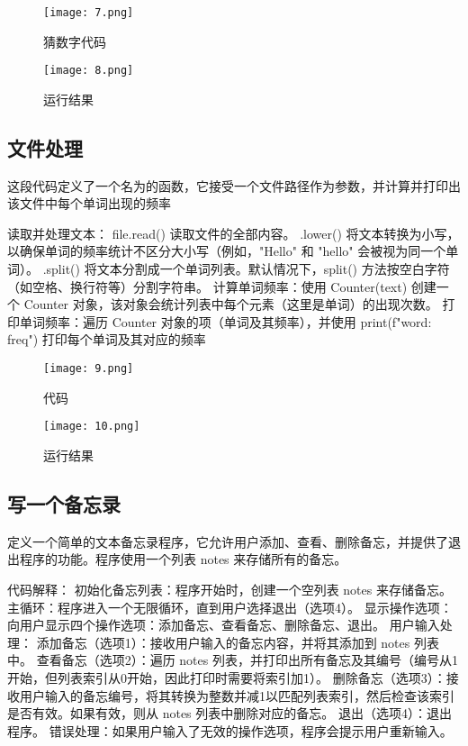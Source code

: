 \documentclass[a4paper, 12pt]{article}
\begin{document}
\begin{figure}[H]
  \centering
    \texttt{[image: 7.png]}
  \caption{猜数字代码}
   \end{figure}
   
\begin{figure}[H]
  \centering
    \texttt{[image: 8.png]}
  \caption{运行结果}
   \end{figure}   
   
\subsection{文件处理}  
这段代码定义了一个名为的函数，它接受一个文件路径作为参数，并计算并打印出该文件中每个单词出现的频率

读取并处理文本：
file.read() 读取文件的全部内容。
.lower() 将文本转换为小写，以确保单词的频率统计不区分大小写（例如，"Hello" 和 "hello" 会被视为同一个单词）。
.split() 将文本分割成一个单词列表。默认情况下，split() 方法按空白字符（如空格、换行符等）分割字符串。
计算单词频率：使用 Counter(text) 创建一个 Counter 对象，该对象会统计列表中每个元素（这里是单词）的出现次数。
打印单词频率：遍历 Counter 对象的项（单词及其频率），并使用 print(f"{word}: {freq}") 打印每个单词及其对应的频率


\begin{figure}[H]
  \centering
    \texttt{[image: 9.png]}
  \caption{代码}
   \end{figure}   

   \begin{figure}[H]
  \centering
    \texttt{[image: 10.png]}
  \caption{运行结果}
   \end{figure}   

\subsection{写一个备忘录}  
定义一个简单的文本备忘录程序，它允许用户添加、查看、删除备忘，并提供了退出程序的功能。程序使用一个列表 notes 来存储所有的备忘。

代码解释：
初始化备忘列表：程序开始时，创建一个空列表 notes 来存储备忘。
主循环：程序进入一个无限循环，直到用户选择退出（选项4）。
显示操作选项：向用户显示四个操作选项：添加备忘、查看备忘、删除备忘、退出。
用户输入处理：
添加备忘（选项1）：接收用户输入的备忘内容，并将其添加到 notes 列表中。
查看备忘（选项2）：遍历 notes 列表，并打印出所有备忘及其编号（编号从1开始，但列表索引从0开始，因此打印时需要将索引加1）。
删除备忘（选项3）：接收用户输入的备忘编号，将其转换为整数并减1以匹配列表索引，然后检查该索引是否有效。如果有效，则从 notes 列表中删除对应的备忘。
退出（选项4）：退出程序。
错误处理：如果用户输入了无效的操作选项，程序会提示用户重新输入。
\end{document}

